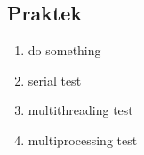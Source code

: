 \subsection{Praktek}
\begin{enumerate}
	\item do something
    
	\hfill\break
	\item serial test
	\hfill\break
	
	\item multithreading test
	\hfill\break
	
	\item multiprocessing test
	\hfill\break
	
\end{enumerate}
